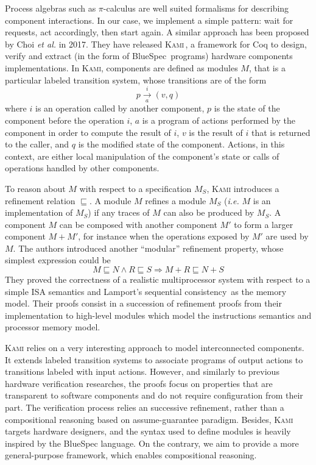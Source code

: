 Process algebras such as \( \pi \)-calculus are well suited formalisms for
describing component interactions.
%
In our case, we implement a simple pattern: wait for requests, act accordingly,
then start again.
%
A similar approach has been proposed by Choi \emph{et al.} in 2017.
%
They have released {\scshape Kami}\,\cite{choi2017kami}, a framework for Coq to
design, verify and extract (in the form of BlueSpec\,\cite{nikhil2004bluespec}
programs) hardware components implementations.
%
In {\scshape Kami}, components are defined as modules \( M \), that is a
particular labeled transition system, whose transitions are of the form
%
\[
  p \xrightarrow[a]{i} (v, q)
\]
%
where \( i \) is an operation called by another component, \( p \) is the state
of the component before the operation \( i \), \( a \) is a program of actions
performed by the component in order to compute the result of \( i \), \( v \) is
the result of \( i \) that is returned to the caller, and \( q \) is the
modified state of the component.
%
Actions, in this context, are either local manipulation of the component's state
or calls of operations handled by other components.

To reason about \( M \) with respect to a specification \( M_S \), {\scshape
  Kami} introduces a refinement relation \( \sqsubseteq \).
%
A module \( M \) refines a module \( M_S \) (\emph{i.e.} \( M \) is an
implementation of \( M_S \)) if any traces of \( M \) can also be produced by
\( M_S \).
%
A component \( M \) can be composed with another component \( M' \) to form a
larger component \( M + M' \), for instance when the operations exposed by
\( M' \) are used by \( M \).
%
The authors introduced another ``modular'' refinement property, whose simplest
expression could be
%
\[
  M \sqsubseteq N \wedge R \sqsubseteq S \Rightarrow M + R \sqsubseteq N + S
\]
%
They proved the correctness of a realistic multiprocessor system with respect to
a simple ISA semantics and Lamport's sequential
consistency\,\cite{lamport1979sc} as the memory model.
%
Their proofs consist in a succession of refinement proofs from their
implementation to high-level modules which model the instructions semantics and
processor memory model.

{\scshape Kami} relies on a very interesting approach to model interconnected
components.
%
It extends labeled transition systems to associate programs of output actions to
transitions labeled with input actions.
%
However, and similarly to previous hardware verification researches, the proofs
focus on properties that are transparent to software components and do not
require configuration from their part.
%
The verification process relies an successive refinement, rather than a
compositional reasoning based on assume-guarantee paradigm.
%
Besides, {\scshape Kami} targets hardware designers, and the syntax used to
define modules is heavily inspired by the BlueSpec language.
%
On the contrary, we aim to provide a more general-purpose framework, which
enables compositional reasoning.

